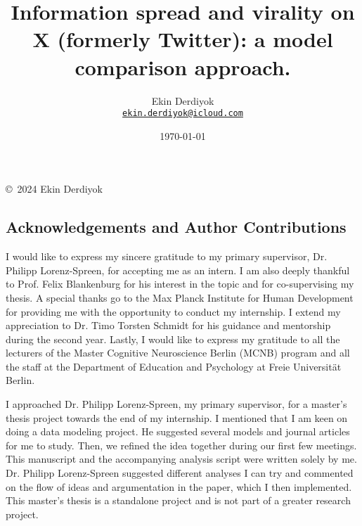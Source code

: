 \documentclass[11pt,a4paper]{article}
\begin{document}
\title{Information spread and virality on X (formerly Twitter): a model comparison approach.}
\author{Ekin Derdiyok\\ 
\texttt{\href{mailto:ekin.derdiyok@icloud.com}{ekin.derdiyok@icloud.com}}}
\date{\today}
\maketitle
\begin{center}
    \copyright~2024 Ekin Derdiyok    
\end{center}
\pagestyle{plain}



\newpage
\doublespacing
\begin{center}
    \section*{Acknowledgements and Author Contributions}     
\end{center}
I would like to express my sincere gratitude to my primary supervisor, Dr. Philipp Lorenz-Spreen, for accepting me as an intern. I am also deeply thankful to Prof. Felix Blankenburg for his interest in the topic and for co-supervising my thesis. A special thanks go to the Max Planck Institute for Human Development for providing me with the opportunity to conduct my internship. I extend my appreciation to Dr. Timo Torsten Schmidt for his guidance and mentorship during the second year. Lastly, I would like to express my gratitude to all the lecturers of the Master Cognitive Neuroscience Berlin (MCNB) program and all the staff at the Department of Education and Psychology at Freie Universität Berlin.

I approached Dr. Philipp Lorenz-Spreen, my primary supervisor, for a master's thesis project towards the end of my internship. I mentioned that I am keen on doing a data modeling project. He suggested several models and journal articles for me to study. Then, we refined the idea together during our first few meetings. This manuscript and the accompanying analysis script were written solely by me. Dr. Philipp Lorenz-Spreen suggested different analyses I can try and commented on the flow of ideas and argumentation in the paper, which I then implemented. This master's thesis is a standalone project and is not part of a greater research project.
 
\end{document}
